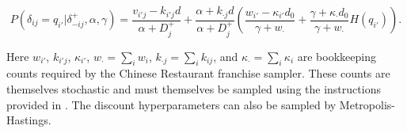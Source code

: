 \begin{equation}
P(\delta_{ij} = q_{i'}|\delta_{-ij}^+,\alpha, \gamma) = \frac{v_{i'j}-k_{i'j}d}{\alpha + D^+_j} + \frac{\alpha + k_{\cdot j}d}{\alpha + D^+_j}\left(\frac{w_{i'} - \kappa_{i'}d_0}{\gamma+w_\cdot} + \frac{\gamma + \kappa_{\cdot}d_0}{\gamma+w_\cdot}H(q_{i'})\right). \label{delta:crf}
\end{equation}

Here $w_{i'}$, $k_{i'j}$, $\kappa_{i'}$, $w_\cdot = \sum_i w_i$, $k_{\cdot j} = \sum_i k_{ij}$, and $\kappa_{\cdot} = \sum_i \kappa_i$ are bookkeeping counts required by the Chinese Restaurant franchise sampler.  These counts are themselves stochastic and must themselves be sampled using the instructions provided in \cite{Teh2006}.  The discount hyperparameters can also be sampled by Metropolis-Hastings.

